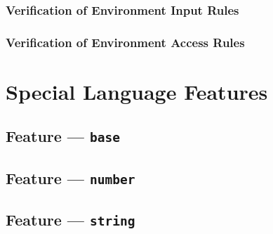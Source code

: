 \subsubsection{Verification of Environment Input Rules} %
\label{ssub:verification_of_environment_input_rules}


\subsubsection{Verification of Environment Access Rules} %
\label{ssub:verification_of_environment_access_rules}




\section{Special Language Features} %
\label{sec:special_language_features}

\subsection{Feature --- \texttt{base}} %
\label{sub:feature_base}


\subsection{Feature --- \texttt{number}} %
\label{sub:feature_number}


\subsection{Feature --- \texttt{string}} %
\label{sub:feature_string}

